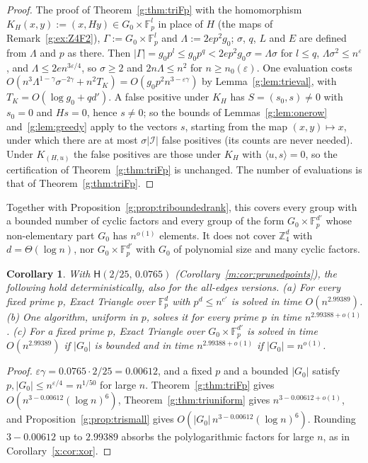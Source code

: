 \documentclass[11pt]{article}
\newtheorem{corollary}[theorem]{Corollary}
\theoremstyle{definition}
\theoremstyle{remark}
\newcommand{\Z}{\mathbb{Z}}
\newcommand{\Fp}{\mathbb{F}_p}
\newcommand{\eps}{\varepsilon}
\newcommand{\Iq}{\mathcal{I}}
\newcommand{\Hyp}{\mathsf{H}}
\newcommand{\EpsGammaBest}{0.00612}%
\newcommand{\HypPrunedEps}{2/25}%
\newcommand{\HypPrunedGamma}{0.0765}%
\newcommand{\ExpAPSPBest}{2.99388}%
\newcommand{\ExpTriBestUp}{2.99389}%
\begin{document}
\begin{proof}
The proof of Theorem~\ref{g:thm:triFp} with the homomorphism $K_H(x,y):=(x,Hy)\in G_0\times\Fp^l$ in place of $H$ (the maps of Remark~\ref{g:ex:Z4F2}), $\Gamma:=G_0\times\Fp^l$ and $\Lambda:=2ep^2g_0$; $\sigma$, $q$, $L$ and $E$ are defined from $\Lambda$ and $p$ as there. Then $|\Gamma|=g_0p^l\le g_0p^q<2ep^2g_0\sigma=\Lambda\sigma$ for $l\le q$, $\Lambda\sigma^2\le n^\eps$, and $\Lambda\le2en^{3\eps/4}$, so $\sigma\ge2$ and $2n\Lambda\le n^2$ for $n\ge n_0(\eps)$. One evaluation costs $O(n^3\Lambda^{1-\gamma}\sigma^{-2\gamma}+n^2T_K)=O(g_0p^2n^{3-\eps\gamma})$ by Lemma~\ref{g:lem:trieval}, with $T_K=O(\log g_0+qd')$. A false positive under $K_H$ has $S=(s_0,s)\ne0$ with $s_0=0$ and $Hs=0$, hence $s\ne0$; so the bounds of Lemmas~\ref{g:lem:onerow} and~\ref{g:lem:greedy} apply to the vectors $s$, starting from the map $(x,y)\mapsto x$, under which there are at most $\sigma|\Iq|$ false positives (its counts are never needed). Under $K_{(H,u)}$ the false positives are those under $K_H$ with $\langle u,s\rangle=0$, so the certification of Theorem~\ref{g:thm:triFp} is unchanged. The number of evaluations is that of Theorem~\ref{g:thm:triFp}.
\end{proof}

Together with Proposition~\ref{g:prop:triboundedrank}, this covers every group with a bounded number of cyclic factors and every group of the form $G_0\times\Fp^{d'}$ whose non-elementary part $G_0$ has $n^{o(1)}$ elements. It does not cover $\Z_4^d$ with $d=\Theta(\log n)$, nor $G_0\times\Fp^{d'}$ with $G_0$ of polynomial size and many cyclic factors.

\begin{corollary}\label{g:cor:explicitT}
With $\Hyp(\HypPrunedEps,\,\HypPrunedGamma)$ (Corollary~\ref{m:cor:prunedpoints}), the following hold deterministically, also for the all-edges versions. \textup{(a)} For every fixed prime $p$, Exact Triangle over $\Fp^d$ with $p^d\le n^{c'}$ is solved in time $O(n^{\ExpTriBestUp})$. \textup{(b)} One algorithm, uniform in $p$, solves it for every prime $p$ in time $n^{\ExpAPSPBest+o(1)}$. \textup{(c)} For a fixed prime $p$, Exact Triangle over $G_0\times\Fp^{d'}$ is solved in time $O(n^{\ExpTriBestUp})$ if $|G_0|$ is bounded and in time $n^{\ExpAPSPBest+o(1)}$ if $|G_0|=n^{o(1)}$.
\end{corollary}
\begin{proof}
$\eps\gamma=\HypPrunedGamma\cdot\HypPrunedEps=\EpsGammaBest$, and a fixed $p$ and a bounded $|G_0|$ satisfy $p,|G_0|\le n^{\eps/4}=n^{1/50}$ for large $n$. Theorem~\ref{g:thm:triFp} gives $O(n^{3-\EpsGammaBest}(\log n)^6)$, Theorem~\ref{g:thm:triuniform} gives $n^{3-\EpsGammaBest+o(1)}$, and Proposition~\ref{g:prop:trismall} gives $O(|G_0|\,n^{3-\EpsGammaBest}(\log n)^6)$. Rounding $3-\EpsGammaBest$ up to $\ExpTriBestUp$ absorbs the polylogarithmic factors for large $n$, as in Corollary~\ref{x:cor:xor}.
\end{proof}
\end{document}
